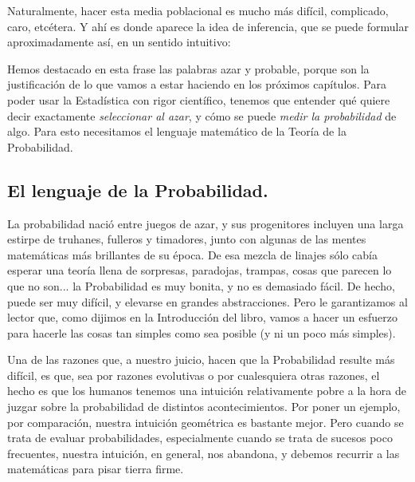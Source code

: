 Naturalmente, hacer esta media poblacional es mucho más difícil, complicado, caro, etcétera. Y ahí
es donde aparece la idea de inferencia, que se puede formular aproximadamente así, en un sentido
intuitivo:
    \begin{center}
    \end{center}
    Hemos destacado en esta frase las palabras azar y probable, porque son la justificación de lo que
    vamos a estar haciendo en los próximos capítulos. Para poder usar la Estadística con rigor
    científico, tenemos que entender qué quiere decir exactamente {\em seleccionar al azar}, y cómo
    se puede {\em medir la probabilidad} de algo. Para esto necesitamos el lenguaje matemático de la
    Teoría de la Probabilidad.

\subsection*{El lenguaje de la Probabilidad.}

La probabilidad nació entre juegos de azar, y sus progenitores incluyen una larga estirpe de
truhanes, fulleros y timadores, junto con algunas de las mentes matemáticas más brillantes de su
época. De esa mezcla de linajes sólo cabía esperar una teoría llena de sorpresas, paradojas,
trampas, cosas que parecen lo que no son... la Probabilidad es muy bonita, y no es demasiado fácil.
De hecho, puede ser muy difícil, y elevarse en grandes abstracciones. Pero le garantizamos al
lector que, como dijimos en la Introducción del libro, vamos a hacer un esfuerzo para hacerle las cosas tan simples como sea posible (y ni un poco más simples).

Una de las razones que, a nuestro juicio, hacen que la Probabilidad resulte más difícil, es que,
sea por razones evolutivas o por cualesquiera  otras razones, el hecho es que los humanos tenemos
una intuición relativamente pobre a la hora de juzgar sobre la probabilidad de distintos
acontecimientos. Por poner un ejemplo, por comparación, nuestra intuición geométrica es bastante
mejor. Pero cuando se trata de evaluar probabilidades, especialmente cuando se trata de sucesos
poco frecuentes, nuestra intuición, en general, nos abandona, y debemos recurrir a las matemáticas
para pisar tierra firme.

